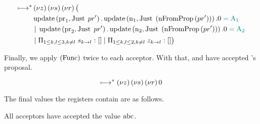 \begin{align*}
\mapstostar& \NuChannels \big (\\
&
    \update{\ProposalRegister_1}{\Just{pr'}}.
    \update{\NumberRegister_1}{\Just{\Paren{\nFromProposal{pr'}}}}.
    \End
    \comment{= \Acceptor{1}}\\
&\Or
    \update{\ProposalRegister_2}{\Just{pr'}}.
    \update{\NumberRegister_2}{\Just{\Paren{\nFromProposal{pr'}}}}.
    \End
    \comment{= \Acceptor{2}}\\
&\Or \InnerSessionQueues{\ChannelS}
\Or \OuterSessionQueues
\big )
\end{align*}

Finally, we apply $\RSideEffect$ twice to each acceptor.
With that,  and  have accepted 's proposal.

\[\mapstostar \NuChannels \End\]

The final values the registers contain are as follows.


All acceptors have accepted the value $\ABC$.

